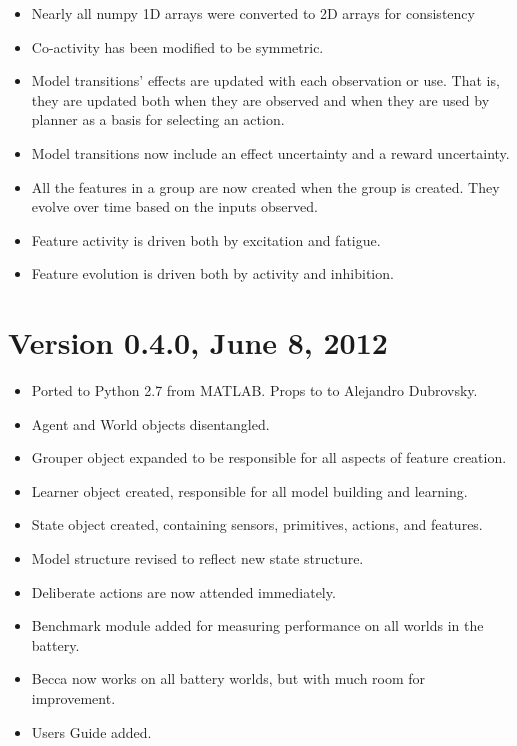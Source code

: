 \begin{itemize}
\item Nearly all numpy 1D arrays were converted to 2D arrays for consistency   
\item Co-activity has been modified to be symmetric.
\item Model transitions' effects are updated with each observation or use. That is, they are updated both when they are observed and when they are used by planner as a basis for selecting an action.
\item Model transitions now include an effect uncertainty and a reward uncertainty. 
\item All the features in a group are now created when the group is created. They evolve over time based on the inputs observed.
\item Feature activity is driven both by excitation and fatigue.
\item Feature evolution is driven both by activity and inhibition.
\end{itemize}


\section*{Version 0.4.0, June 8, 2012}

\begin{itemize}
\item Ported to Python 2.7 from MATLAB. Props to to Alejandro Dubrovsky.
\item Agent and World objects disentangled.
\item Grouper object expanded to be responsible for all aspects of feature creation.
\item Learner object created, responsible for all model building and learning.
\item State object created, containing sensors, primitives, actions, and features.
\item Model structure revised to reflect new state structure.
\item Deliberate actions are now attended immediately.
\item Benchmark module added for measuring performance on all worlds in the battery.
\item Becca now works on all battery worlds, but with much room for improvement.
\item Users Guide added. 
\end{itemize}

